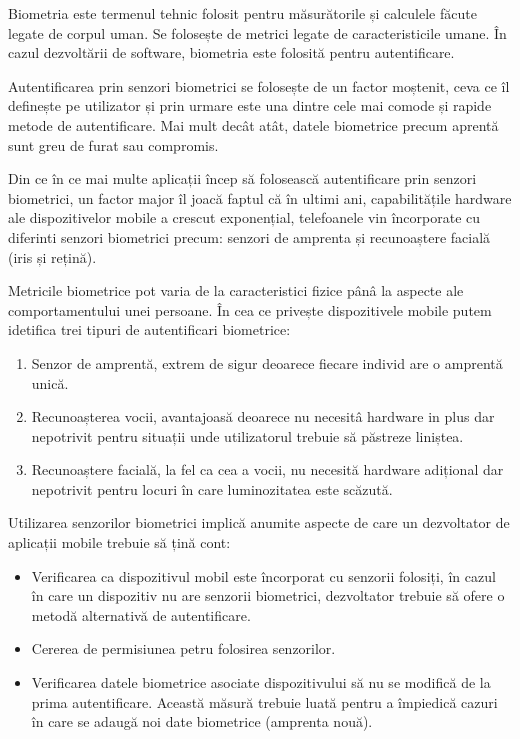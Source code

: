 \documentclass[12pt]{article}
\begin{document}
Biometria este termenul tehnic folosit pentru măsurătorile și calculele făcute legate
de corpul uman. Se folosește de metrici legate de caracteristicile umane. În cazul
dezvoltării de software, biometria este folosită pentru autentificare.

Autentificarea prin senzori biometrici se folosește de un factor moștenit, ceva ce îl definește pe
utilizator și prin urmare este una dintre cele mai comode și rapide metode de autentificare.
Mai mult decât atât, datele biometrice precum aprentă sunt greu de furat sau compromis.

Din ce în ce mai multe aplicații încep să folosească autentificare prin senzori 
biometrici, un factor major îl joacă faptul că în ultimi ani, capabilitățile hardware ale
dispozitivelor mobile a crescut exponențial, telefoanele vin încorporate cu diferinti
senzori biometrici precum: senzori de amprenta și recunoaștere facială (iris și rețină).

Metricile biometrice pot varia de la caracteristici fizice pânâ la aspecte ale 
comportamentului unei persoane. În cea ce privește dispozitivele mobile putem idetifica
trei tipuri de autentificari biometrice:

\begin{enumerate}
    \item Senzor de amprentă, extrem de sigur deoarece fiecare individ are
    o amprentă unică.
    \item Recunoașterea vocii, avantajoasă deoarece nu necesitâ hardware in plus dar
    nepotrivit pentru situații unde utilizatorul trebuie să păstreze liniștea.
    \item Recunoaștere facială, la fel ca cea a vocii, nu necesită hardware adițional dar 
    nepotrivit pentru locuri în care luminozitatea este scăzută. 
\end{enumerate}


Utilizarea senzorilor biometrici implică anumite aspecte de care un dezvoltator de
aplicații mobile trebuie să țină cont:

\begin{itemize}
    \item Verificarea ca dispozitivul mobil este încorporat cu senzorii folosiți,
    în cazul în care un dispozitiv nu are senzorii biometrici, dezvoltator trebuie 
    să ofere o metodă alternativă de autentificare. \cite{enisa-2017}
    \item Cererea de permisiunea petru folosirea senzorilor.
    \item Verificarea datele biometrice asociate dispozitivului să nu se modifică
    de la prima autentificare. Această măsură trebuie luată pentru a împiedică cazuri
    în care se adaugă noi date biometrice (amprenta nouă).
\end{itemize}
\end{document}
